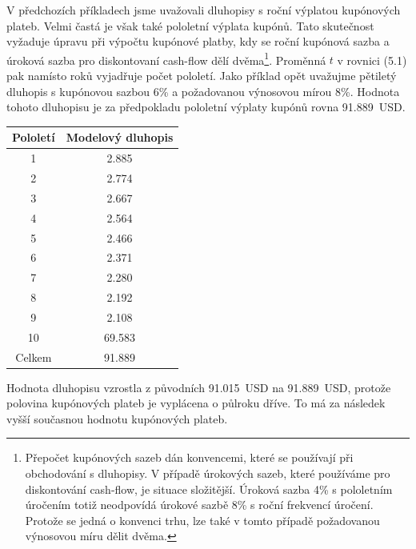 \documentclass[a4paper]{book}
\begin{document}
V předchozích příkladech jsme uvažovali dluhopisy s roční výplatou kupónových plateb. Velmi častá je však také pololetní výplata kupónů. Tato skutečnost vyžaduje úpravu při výpočtu kupónové platby, kdy se roční kupónová sazba a úroková sazba pro diskontovaní cash-flow dělí dvěma\footnote{Přepočet kupónových sazeb dán konvencemi, které se používají při obchodování s dluhopisy. V případě úrokových sazeb, které používáme pro diskontování cash-flow, je situace složitější. Úroková sazba 4\% s pololetním úročením totiž neodpovídá úrokové sazbě 8\% s roční frekvencí úročení. Protože se jedná o konvenci trhu, lze také v tomto případě požadovanou výnosovou míru dělit dvěma.}. Proměnná $t$ v rovnici (5.1) pak namísto roků vyjadřuje počet pololetí. Jako příklad opět uvažujme pětiletý dluhopis s kupónovou sazbou 6\% a požadovanou výnosovou mírou 8\%. Hodnota tohoto dluhopisu je za předpokladu pololetní výplaty kupónů rovna 91.889~USD.
\begin{center}
\begin{tabular}{c c}
\textbf{Pololetí} & \textbf{Modelový dluhopis}\\
\hline
1      &  2.885\\
2      &  2.774\\
3      &  2.667\\
4      &  2.564\\
5      &  2.466\\
6      &  2.371\\
7      &  2.280\\
8      &  2.192\\
9      &  2.108\\
10     & 69.583\\
Celkem & 91.889
\end{tabular}
\end{center}
Hodnota dluhopisu vzrostla z původních 91.015~USD na 91.889~USD, protože polovina kupónových plateb je vyplácena o půlroku dříve. To má za následek vyšší současnou hodnotu kupónových plateb.
\end{document}
